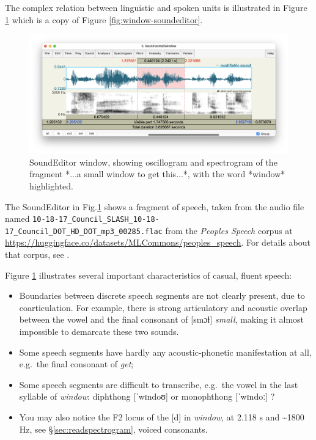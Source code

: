 \documentclass[
]{book}
\begin{document}
The complex relation between linguistic and spoken units is illustrated in Figure \ref{fig:window-soundeditor-again} which is a copy of Figure \ref{fig:window-soundeditor}.

\begin{figure}

{\centering \includegraphics{figures/asmallwindowtogetthis_SoundEditor2050124} 

}

\caption{SoundEditor window, showing oscillogram and spectrogram of the fragment *...a small window to get this...*, with the word *window* highlighted.}\label{fig:window-soundeditor-again}
\end{figure}

\label{box-windowsfile-details-again}
The SoundEditor in Fig.\ref{fig:window-soundeditor-again} shows a fragment of speech, taken from the audio file named \texttt{10-18-17\_Council\_SLASH\_10-18-17\_Council\_DOT\_HD\_DOT\_mp3\_00285.flac} from the \emph{Peoples Speech} corpus at \url{https://huggingface.co/datasets/MLCommons/peoples_speech}. For details about that corpus, see \citet{Galvez_Diamos_Ciro_Cerón_Achorn_Gopi_Kanter_Lam_Mazumder_Reddi_2021}.

Figure \ref{fig:window-soundeditor-again} illustrates several important characteristics of casual, fluent speech:

\begin{itemize}
\item
  Boundaries between discrete speech segments are not clearly present, due to coarticulation. For example, there is strong articulatory and acoustic overlap between the vowel and the final consonant of {[}smɔɫ{]} \emph{small}, making it almost impossible to demarcate these two sounds.
\item
  Some speech segments have hardly any acoustic-phonetic manifestation at all, e.g.~the final consonant of \emph{get};
\item
  Some speech segments are difficult to transcribe, e.g.~the vowel in the last syllable of \emph{window}: diphthong {[}ˈwɪndoʊ{]} or monophthong {[}ˈwɪndoː{]} ?
\item
  You may also notice the F2 locus of the {[}d{]} in \emph{window}, at 2.118 s and \textasciitilde1800 Hz, see §\ref{sec:readspectrogram}, voiced consonants.
\end{itemize}
\end{document}
